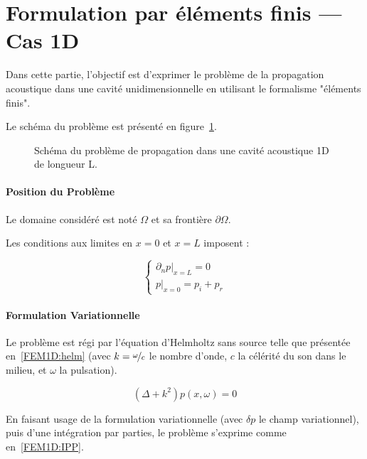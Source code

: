 \newcommand\DP{\delta p}
\newcommand\dd{\mathrm{d}}
\newcommand\ul{\underline}

\section{Formulation par éléments finis --- Cas 1D}

Dans cette partie, l'objectif est d'exprimer le problème de la propagation acoustique dans une cavité unidimensionnelle
en utilisant le formalisme "éléments finis".

Le schéma du problème est présenté en figure~\ref{fig:FEM:propa_1D}.

\begin{figure}[!ht]
	\centering
	
	\caption{\label{fig:FEM:propa_1D}Schéma du problème de propagation dans une cavité acoustique 1D de longueur L.}
\end{figure}

\paragraph{Position du Problème}

Le domaine considéré est noté $\Omega$ et sa frontière $\partial\Omega$.

Les conditions aux limites en $x=0$ et $x=L$ imposent :

\begin{equation}
	\left\{\begin{array}{l}
	\left.\partial_np\right|_{x=L} = 0\\
	\left.p\right|_{x=0} = p_i+p_r
	\end{array}\right. \label{FEM1D:BC}
\end{equation}


\paragraph{Formulation Variationnelle}

Le problème est régi par l'équation d'Helmholtz sans source telle que présentée en~\eqref{FEM1D:helm} (avec $k =
\nicefrac{\omega}{c}$ le nombre d'onde, $c$ la célérité du son dans le milieu, et $\omega$ la pulsation).

\begin{equation}
	(\Delta + k^2)p(x,\omega) = 0 \label{FEM1D:helm}
\end{equation}

En faisant usage de la formulation variationnelle (avec $\DP$ le champ variationnel), puis d'une intégration par
parties, le problème s'exprime comme en~\eqref{FEM1D:IPP}.

